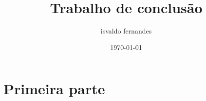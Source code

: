 \documentclass[11pt,a4paper]{article}
\title{Trabalho de conclusão}
\author{isvaldo fernandes}
\date{\today}
\begin{document}
	\begin{titlepage}
	\maketitle
	\end{titlepage}
	
	\begin{abstract}
	\lipsum[1]
	\end{abstract}
	
	\section{Primeira parte}

\lipsum
\end{document}
